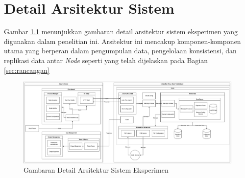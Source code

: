 \chapter{Detail Arsitektur Sistem}
\label{appendix:detailed-architecture}

Gambar \ref{fig:detailed-architecture} menunjukkan gambaran detail arsitektur sistem eksperimen yang digunakan dalam penelitian ini. Arsitektur ini mencakup komponen-komponen utama yang berperan dalam pengumpulan data, pengelolaan konsistensi, dan replikasi data antar \textit{Node} seperti yang telah dijelaskan pada Bagian \ref{sec:rancangan}

\begin{figure}[ht]
    \centering
    \includegraphics[width=\textwidth]{resources/appendix/detailed-architecture.png}
    
    \caption{Gambaran Detail Arsitektur Sistem Eksperimen}
    \label{fig:detailed-architecture}
\end{figure}